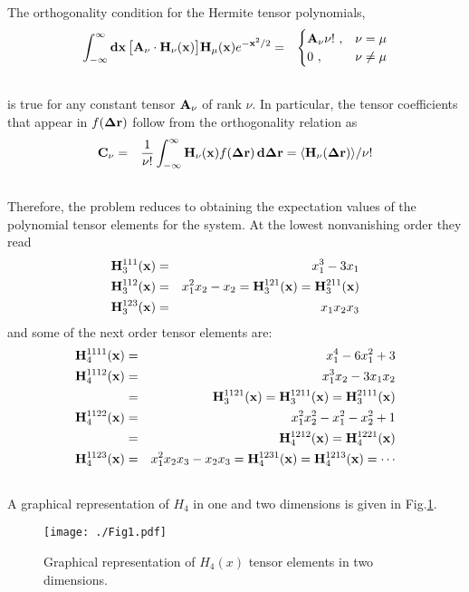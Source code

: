 \documentclass[prl,nofootinbib,twocolumn,floatfix,showpacs]{revtex4}
\begin{document}
The orthogonality condition for the Hermite tensor polynomials,
\begin{eqnarray}
\int_{-\infty}^{\infty}{\bf dx}\, \big[{\bf A}_\nu\cdot {\bf H}_\nu({\bf x})\big] {\bf
  H}_\mu({\bf x})e^{-{\bf x}^2/2} &=& \begin{cases}{\bf A}_\nu\nu !\ , & \nu=\mu
  \\ 0\ , & \nu\neq\mu \end{cases} \nonumber \\
&&\label{orthogonality}
\end{eqnarray}
is true for any constant tensor ${\bf A}_\nu$ of rank $\nu$.  In
particular, the tensor coefficients that appear in $f({\bf \Delta r})$
follow from the orthogonality relation as
\begin{eqnarray}
{\bf C}_\nu &=& \frac{1}{\nu!}\int_{-\infty}^{\infty} {\bf H}_\nu({\bf x})
f({\bf\Delta r})\, {\bf d\Delta r} =  \langle {\bf H}_\nu({\bf\Delta r})\rangle/\nu!\nonumber \\
&& \label{coefs}
\end{eqnarray}
Therefore, the problem reduces to obtaining the expectation values of
the polynomial tensor elements for the system. At the lowest
nonvanishing order they read
\begin{eqnarray}
\label{H3}
{\bf H}_3^{111}({\bf x}) &=& x_1^3 -3x_1 \nonumber \\
{\bf H}_3^{112}({\bf x}) &=& x_1^2x_2 -x_2 = {\bf H}_3^{121}({\bf x}) = {\bf
  H}_3^{211}({\bf x}) \nonumber \\
{\bf H}_3^{123}({\bf x}) &=& x_1x_2x_3 \nonumber \\
\end{eqnarray}
and some of the next order tensor elements are:
\begin{eqnarray}
\label{H4}
{\bf H}_4^{1111}({\bf x}) &=& x_1^4 -6x_1^2 + 3 \nonumber \\
{\bf H}_4^{1112}({\bf x}) &=& x_1^3x_2 - 3x_1x_2 \nonumber \\
&=& {\bf H}_3^{1121}({\bf x}) = {\bf H}_3^{1211}({\bf x}) = {\bf  H}_3^{2111}({\bf x}) \nonumber \\
{\bf H}_4^{1122}({\bf x}) &=& x_1^2x_2^2 - x_1^2 - x_2^2 + 1 \nonumber \\
&=& {\bf H}_4^{1212}({\bf x}) = {\bf  H}_4^{1221}({\bf x}) \nonumber \\
{\bf H}_4^{1123}({\bf x}) &=& x_1^2x_2x_3 - x_2x_3  = {\bf H}_4^{1231}({\bf x}) = {\bf H}_4^{1213}({\bf x}) = \cdots\nonumber \\
&& \label{H4}
\end{eqnarray}
A graphical representation of $H_4$ in one and two dimensions is given in Fig.\ref{Fig1}. 
\begin{figure}
\vspace*{2cm}
  \begin{center}
    \texttt{[image: ./Fig1.pdf]}
  \end{center}
\caption{ Graphical representation of $H_4(x)$ tensor elements in two dimensions.}
\label{Fig1}
\end{figure}
\end{document}
